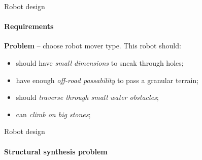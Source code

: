 \documentclass[aspectratio=169,xcolor=table]{beamer}
\begin{document}
\begin{frame}[t]{Robot design}
    \framesubtitle{Requirements}
    \large
    \textbf{Problem} --  choose robot mover type. This robot should:
    \begin{itemize}
        \item should have \textit{small dimensions} to sneak through holes;
        \item have enough \textit{off-road passability} to pass a granular terrain;
        \item should \textit{traverse through small water obstacles};
        \item can \textit{climb on big stones};
    \end{itemize}
\end{frame}

\begin{frame}[t]{Robot design}
    \framesubtitle{Structural synthesis problem}
\end{frame}
\end{document}
